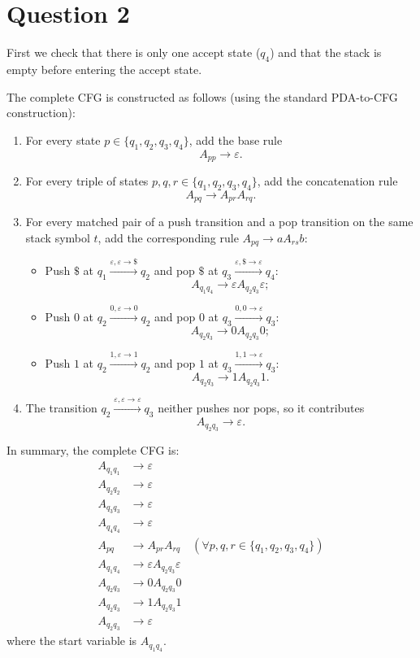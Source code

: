 \documentclass[a4paper, UTF-8]{article}
\theoremstyle{plain}
\begin{document}
\section{Question 2}

First we check that there is only one accept state ($q_4$) and that the stack is empty before entering the accept state.

The complete CFG is constructed as follows (using the standard PDA-to-CFG construction):
\begin{enumerate}
    \item For every state $p \in \{q_1,q_2,q_3,q_4\}$, add the base rule
    \[
        A_{pp} \to \varepsilon .
    \]
    \item For every triple of states $p,q,r \in \{q_1,q_2,q_3,q_4\}$, add the concatenation rule
    \[
        A_{pq} \to A_{pr}A_{rq} .
    \]
    \item For every matched pair of a push transition and a pop transition on the same stack symbol $t$, add the corresponding rule $A_{pq} \to a A_{rs} b$:
    \begin{itemize}
        \item Push $\$$ at $q_1 \xrightarrow{\varepsilon,\varepsilon\to\$} q_2$ and pop $\$$ at $q_3 \xrightarrow{\varepsilon,\$\to\varepsilon} q_4$:
        \[
            A_{q_1q_4} \to \varepsilon A_{q_2q_3} \varepsilon ;
        \]
        \item Push $0$ at $q_2 \xrightarrow{0,\varepsilon\to 0} q_2$ and pop $0$ at $q_3 \xrightarrow{0,0\to\varepsilon} q_3$:
        \[
            A_{q_2q_3} \to 0 A_{q_2q_3} 0 ;
        \]
        \item Push $1$ at $q_2 \xrightarrow{1,\varepsilon\to 1} q_2$ and pop $1$ at $q_3 \xrightarrow{1,1\to\varepsilon} q_3$:
        \[
            A_{q_2q_3} \to 1 A_{q_2q_3} 1 .
        \]
    \end{itemize}
    \item The transition $q_2 \xrightarrow{\varepsilon,\varepsilon\to\varepsilon} q_3$ neither pushes nor pops, so it contributes
    \[
        A_{q_2q_3} \to \varepsilon .
    \]
\end{enumerate}

In summary, the complete CFG is:
\begin{align*}
    A_{q_1q_1} &\to \varepsilon \\[-3pt]
    A_{q_2q_2} &\to \varepsilon \\[-3pt]
    A_{q_3q_3} &\to \varepsilon \\[-3pt]
    A_{q_4q_4} &\to \varepsilon \\[2pt]
    A_{pq} &\to A_{pr}A_{rq} \quad (\forall p,q,r \in \{q_1,q_2,q_3,q_4\}) \\[2pt]
    A_{q_1q_4} &\to \varepsilon A_{q_2q_3} \varepsilon \\[-3pt]
    A_{q_2q_3} &\to 0 A_{q_2q_3} 0 \\[-3pt]
    A_{q_2q_3} &\to 1 A_{q_2q_3} 1 \\[-3pt]
    A_{q_2q_3} &\to \varepsilon
\end{align*}
where the start variable is $A_{q_1q_4}$.
\end{document}
